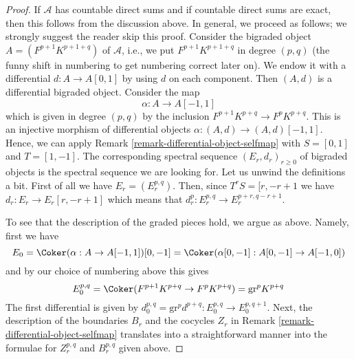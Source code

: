 \begin{proof}
If $\mathcal{A}$ has countable direct sums and if countable direct
sums are exact, then this follows from the discussion above.
In general, we proceed as follows; we strongly suggest the reader
skip this proof. Consider the bigraded object $A = (F^{p + 1}K^{p + 1 + q})$
of $\mathcal{A}$, i.e., we put $F^{p + 1}K^{p + 1 + q}$ in degree $(p, q)$
(the funny shift in numbering to get numbering correct later on).
We endow it with a differential $d : A \to A[0, 1]$ by using $d$
on each component. Then $(A, d)$ is a differential bigraded object.
Consider the map
$$
\alpha : A \to A[-1, 1]
$$
which is given in degree $(p, q)$ by the inclusion
$F^{p + 1}K^{p + q} \to F^pK^{p + q}$.
This is an injective morphism of differential objects
$\alpha : (A, d) \to (A, d)[-1, 1]$. Hence, we can apply
Remark \ref{remark-differential-object-selfmap}
with $S = [0, 1]$ and $T = [1, -1]$.
The corresponding spectral sequence $(E_r, d_r)_{r \geq 0}$
of bigraded objects is the spectral sequence we are looking
for. Let us unwind the definitions a bit. First of all we have
$E_r = (E_r^{p, q})$. Then, since $T^rS = [r, -r + 1$
we have $d_r : E_r \to E_r[r, -r + 1]$ which means that
$d_r^p : E_r^{p, q} \to E_r^{p + r, q - r + 1}$.

\medskip\noindent
To see that the description of the graded pieces hold, we argue
as above. Namely, first we have
$$
E_0 = \Coker(\alpha : A \to A[-1, 1])[0, -1] =
\Coker(\alpha[0, -1] : A[0, -1] \to A[-1, 0])
$$
and by our choice of numbering above this gives
$$
E_0^{p, q} = \Coker(F^{p + 1}K^{p + q} \to F^pK^{p + q}) = \text{gr}^pK^{p + q}
$$
The first differential is given by
$d_0^{p, q} = \text{gr}^pd^{p + q} : E_0^{p, q} \to E_0^{p, q + 1}$.
Next, the description of the boundaries $B_r$ and the cocycles $Z_r$
in Remark \ref{remark-differential-object-selfmap}
translates into a straightforward manner into the formulae
for $Z_r^{p, q}$ and $B_r^{p, q}$ given above.
\end{proof}

